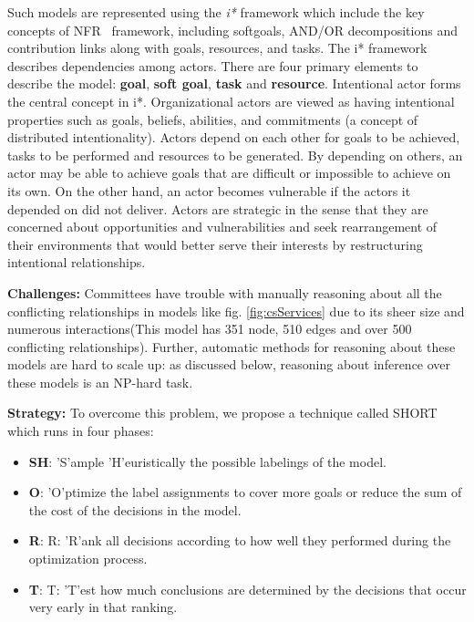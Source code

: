 \documentclass[table, xcdraw, sigconf,review, anonymous]{acmart}
\begin{document}
Such models are represented using the \textit{i*} framework \cite{yu97a} which include the key concepts of NFR~\cite{mylopoulos92.nfr} framework, including softgoals, AND/OR decompositions and contribution links along with goals, resources, and tasks. The i* framework describes dependencies among actors. There are four primary elements to describe the model: \textbf{goal}, \textbf{soft goal}, \textbf{task} and \textbf{resource}. Intentional actor forms the central concept in i*. Organizational actors are viewed as having intentional properties such as goals, beliefs, abilities, and commitments (a concept of distributed intentionality). Actors depend on each other for goals to be achieved, tasks to be performed and resources to be generated. By depending on others, an actor may be able to achieve goals that are difficult or impossible to achieve on its own. On the other hand, an actor becomes vulnerable if the actors it depended on did not deliver. Actors are strategic in the sense that they are concerned about opportunities and vulnerabilities and seek rearrangement of their environments that would better serve their interests by restructuring intentional relationships. 

\noindent\textbf{Challenges: } Committees have trouble with manually reasoning about all the conflicting relationships in models like fig. \ref{fig:csServices} due to its sheer size and numerous interactions(This model has 351 node, 510 edges and over 500 conflicting relationships). Further, automatic methods for reasoning about these models are hard to scale up: as discussed below, reasoning about inference over these models is an NP-hard task. 

\noindent\textbf{Strategy:} To overcome this problem, we propose a technique called SHORT which runs in four phases:
\begin{itemize}
    \item{\textbf{SH}: 'S'ample 'H'euristically the possible labelings of the model.}
    \item{\textbf{O}: 'O'ptimize the label assignments to cover more goals or reduce the sum of the cost of the decisions in the model.}
    \item{\textbf{R}: R: 'R'ank all decisions according to how well they performed during the optimization process.}
    \item{\textbf{T}: T: 'T'est how much conclusions are determined by the decisions that occur very early in that ranking.}
\end{itemize}
\end{document}
